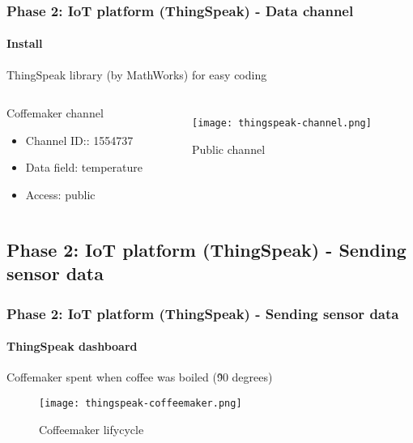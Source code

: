 \documentclass[
    aspectratio=169,                   %
]{beamer}
\begin{document}
    \begin{frame}
        \frametitle{Phase 2: IoT platform (ThingSpeak) - Data channel}

        \paragraph{Install} ThingSpeak library (by MathWorks) for easy coding

        \begin{columns}[T,onlytextwidth]
              \begin{block}{Coffemaker channel}
                \begin{itemize}
                    \item \alert{Channel ID:}: 1554737
                    \item \alert{Data field}: temperature
                    \item \alert{Access}: public\cite{thingspeakchannel}
                \end{itemize}
              \end{block}
            \begin{figure}
                \centering
                \begin{stampbox}
                    \texttt{[image: thingspeak-channel.png]}
                \end{stampbox}
                \caption{Public channel}
            \end{figure}        
        \end{columns}

    \end{frame}

\subsection{Phase 2: IoT platform (ThingSpeak) - Sending sensor data}

    \begin{frame}
        \frametitle{Phase 2: IoT platform (ThingSpeak) - Sending sensor data}

        \paragraph{ThingSpeak dashboard} Coffemaker spent when coffee was boiled (\~90 degrees)

        \begin{figure}
            \centering
            \begin{stampbox}
                \texttt{[image: thingspeak-coffeemaker.png]}
            \end{stampbox}
            \caption{Coffeemaker lifycycle}
        \end{figure}
        
    \end{frame}
\end{document}
